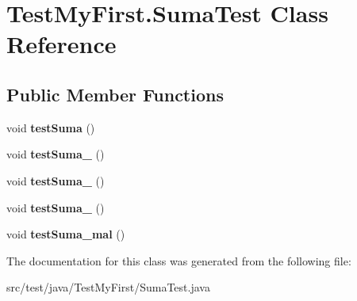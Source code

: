 \hypertarget{class_test_my_first_1_1_suma_test}{}\section{Test\+My\+First.\+Suma\+Test Class Reference}
\label{class_test_my_first_1_1_suma_test}
\subsection*{Public Member Functions}
\begin{DoxyCompactItemize}
\item 
\mbox{\label{class_test_my_first_1_1_suma_test_ab3c1a344bfffa215cff56cc21231fb47}} 
void {\bfseries test\+Suma} ()
\item 
\mbox{\label{class_test_my_first_1_1_suma_test_adaad6860a4a252d15232d7ab63a70f27}} 
void {\bfseries test\+Suma\+\_} ()
\item 
\mbox{\label{class_test_my_first_1_1_suma_test_a1f43548f6ffda7a57a9e34c59cb571c8}} 
void {\bfseries test\+Suma\+\_} ()
\item 
\mbox{\label{class_test_my_first_1_1_suma_test_a4f13747840f70b1d9f71cad4c51ba08e}} 
void {\bfseries test\+Suma\+\_} ()
\item 
\mbox{\label{class_test_my_first_1_1_suma_test_af109d84cebc7ee97b06b9506c684b21c}} 
void {\bfseries test\+Suma\+\_\+mal} ()
\end{DoxyCompactItemize}


The documentation for this class was generated from the following file\+:\begin{DoxyCompactItemize}
\item 
src/test/java/\+Test\+My\+First/Suma\+Test.\+java\end{DoxyCompactItemize}
